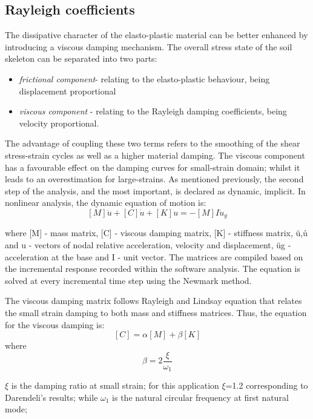 \documentclass[10pt,a4paper]{report}
\begin{document}
\subsection{Rayleigh coefficients}
The dissipative character of the elasto-plastic material can be better enhanced by introducing a viscous damping mechanism. The overall stress state of the soil skeleton can be separated into two parts: 
		\begin{itemize}
	\item \textit{frictional component}- relating to the elasto-plastic behaviour, being displacement proportional
	\item \textit{viscous component} - relating to the Rayleigh damping coefficients, being velocity proportional. 
\end{itemize}

The advantage of coupling these two terms refers to the smoothing of the shear stress-strain cycles as well as a higher material damping. The viscous component has a favourable effect on the damping curves for small-strain domain; whilst it leads to an overestimation for large-strains. 
As mentioned previously, the second step of the analysis, and the most important, is declared as dynamic, implicit. In nonlinear analysis, the dynamic equation of motion is:
\begin{equation}
\left[M\right]{\ddot{u}}+\left[C\right]{\dot{u}}+\left[K\right]{u}=-\left[M\right]{I}\ddot{u}_g
\end{equation}

where [M] - mass matrix, [C] - viscous damping matrix, [K] - stiffness matrix, {ü},{ů} and {u} - vectors of nodal relative acceleration, velocity and displacement, üg - acceleration at the base and {I} - unit vector. The matrices are compiled based on the incremental response recorded within the software analysis. The equation is solved at every incremental time step using the Newmark method.

The viscous damping matrix follows Rayleigh and Lindsay equation that relates the small strain damping to both mass and stiffness matrices. Thus, the equation for the viscous damping is:
\begin{equation}
	\left[C\right]=\alpha\left[M\right]+\beta\left[K\right]
\end{equation}
where
\begin{equation}
		\beta = 2\frac{\xi}{\omega_1}
\end{equation}


$\xi$ is the damping ratio at small strain; for this application $\xi$=1.2 corresponding to Darendeli's results; while $\omega_1$ is the natural circular frequency at first natural mode;
\end{document}
